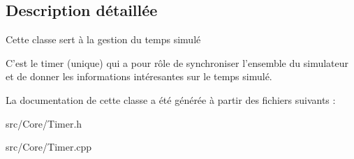 \subsection{Description détaillée}
Cette classe sert à la gestion du temps simulé 

C'est le timer (unique) qui a pour rôle de synchroniser l'ensemble du simulateur et de donner les informations intéresantes sur le temps simulé. 

La documentation de cette classe a été générée à partir des fichiers suivants \-:\begin{DoxyCompactItemize}
\item 
src/\-Core/Timer.\-h\item 
src/\-Core/Timer.\-cpp\end{DoxyCompactItemize}
